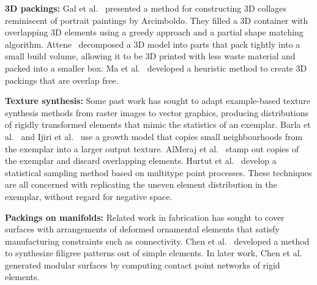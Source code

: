 \textbf{3D packings:}
Gal et al.~\cite{Gal2007B} presented a method for constructing 3D
collages reminiscent of portrait paintings by Arcimboldo.  They
filled a 3D container with overlapping 3D elements using a greedy
approach and a partial shape matching algorithm.
Attene~\cite{Attene2015} decomposed a 3D model into parts that pack
tightly into a small build volume, allowing it to 
be 3D printed with less waste material and packed into a smaller box.
Ma et al.~\cite{Ma2018} developed a heuristic method
to create 3D packings that are overlap free.

\textbf{Texture synthesis:}
Some past work has sought to adapt example-based texture synthesis methods
from raster images to vector graphics, producing distributions of rigidly transformed elements
that mimic the statistics of an exemplar.  Barla et al.~\cite{Barla2006} and
Ijiri et al.~\cite{Ijiri2008} use a growth model that copies small neighbourhoods
from the exemplar into a larger output texture.  AlMeraj et al.~\cite{AlMeraj2013}
stamp out copies of the exemplar and discard overlapping elements.
Hurtut et al.~\cite{Hurtut2009} develop a statistical sampling method based
on multitype point processes.  
These techniques are all concerned with replicating
the uneven element distribution in the exemplar, without regard for negative space.

\textbf{Packings on manifolds:}
Related work in fabrication has sought to cover surfaces with
arrangements of deformed ornamental elements that satisfy manufacturing
constraints such as connectivity.  Chen et al.~\cite{Chen2016}
developed a method to synthesize filigree patterns out of simple
elements. 
In later work, Chen et al.~\cite{Chen2017}
generated modular surfaces by computing 
contact point networks of rigid elements.




